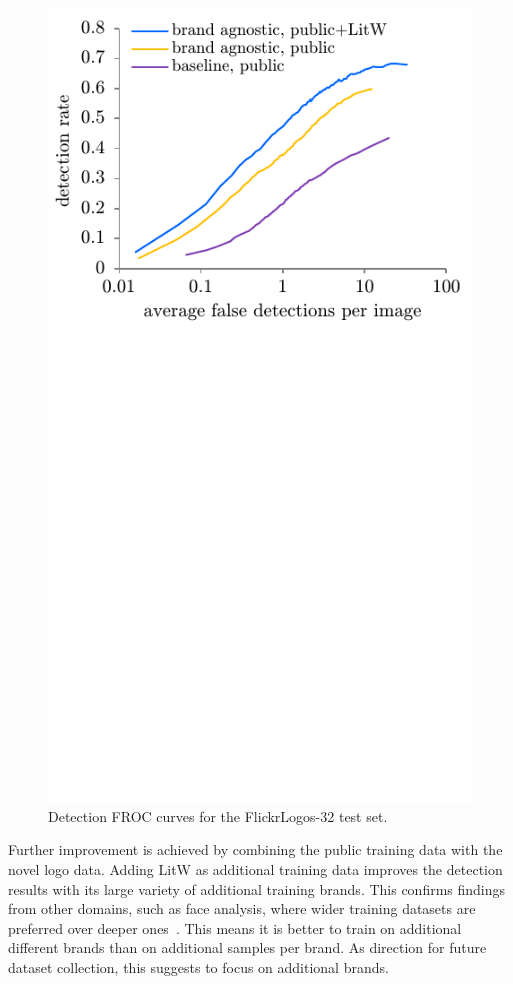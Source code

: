 \documentclass[a4paper,twoside]{article}
\begin{document}
\begin{figure}%
\centering%
\includegraphics[width=\linewidth, trim=0cm 9cm 0cm 0cm, clip]{img/detectionFroc.pdf}%
\caption{Detection FROC curves for the FlickrLogos-32 test set.}%
\label{fig:detectionFroc}
\end{figure}%
%

Further improvement is achieved by combining the public training data with the novel logo data.
Adding \ac{LitW} as additional training data improves the detection results with its large variety of additional training brands. 
This confirms findings from other domains, such as face analysis, where wider training datasets are preferred over deeper ones~\cite{bansal2017}. This means it is better to train on additional different brands than on additional samples per brand.
As direction for future dataset collection, this suggests to focus on additional brands.
\end{document}
